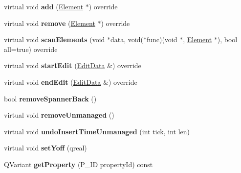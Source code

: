 \begin{DoxyCompactItemize}
virtual void {\bfseries add} (\hyperlink{class_ms_1_1_element}{Element} $\ast$) override
\item 
\mbox{\label{class_ms_1_1_spanner_a7f28ead444ca111c94479ba22c34415b}} 
virtual void {\bfseries remove} (\hyperlink{class_ms_1_1_element}{Element} $\ast$) override
\item 
\mbox{\label{class_ms_1_1_spanner_a1736e1f4fedce0f0d9cf8c9b5e405cda}} 
virtual void {\bfseries scan\+Elements} (void $\ast$data, void($\ast$func)(void $\ast$, \hyperlink{class_ms_1_1_element}{Element} $\ast$), bool all=true) override
\item 
\mbox{\label{class_ms_1_1_spanner_a1a6d6c18afa7378033afe475e28420ee}} 
virtual void {\bfseries start\+Edit} (\hyperlink{class_ms_1_1_edit_data}{Edit\+Data} \&) override
\item 
\mbox{\label{class_ms_1_1_spanner_a51bcce46ff7705d334770ffd2598ecb5}} 
virtual void {\bfseries end\+Edit} (\hyperlink{class_ms_1_1_edit_data}{Edit\+Data} \&) override
\item 
\mbox{\label{class_ms_1_1_spanner_a7c4c9fa9de5c751b15bfd09dcaad8880}} 
bool {\bfseries remove\+Spanner\+Back} ()
\item 
\mbox{\label{class_ms_1_1_spanner_a2da31d82714d7cfd946761a08ecb153c}} 
virtual void {\bfseries remove\+Unmanaged} ()
\item 
\mbox{\label{class_ms_1_1_spanner_a39808170c93eb582c0d04cd6087fcec0}} 
virtual void {\bfseries undo\+Insert\+Time\+Unmanaged} (int tick, int len)
\item 
\mbox{\label{class_ms_1_1_spanner_a8ad061a636ffd4e29811b9cfc9c6c980}} 
virtual void {\bfseries set\+Yoff} (qreal)
\item 
\mbox{\label{class_ms_1_1_spanner_a1962c2c75cdfa11c87a6a894f59e46f2}} 
Q\+Variant {\bfseries get\+Property} (P\+\_\+\+ID property\+Id) const
\item 
\mbox{\label{class_ms_1_1_spanner_ab67a1635003f1fc32b2a383839a78ba8}} 

\end{DoxyCompactItemize}
